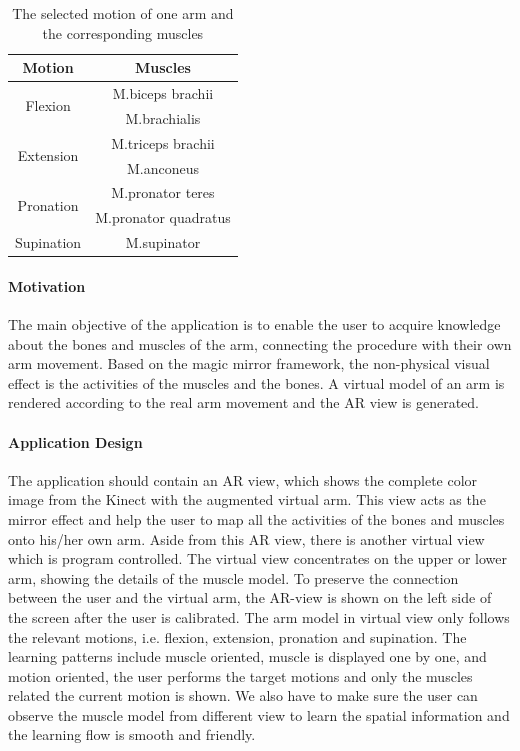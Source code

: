\begin{table}
	\caption[Muscles involved]{The selected motion of one arm and the corresponding muscles}
	\centering
	\label{tb:3-IMR:motionMuscles}
	\scriptsize
	\begin{center}
		\begin{tabular}{|c|c|}
			\hline
			Motion & Muscles \\
			\hline
			\multirow{2}{*}{Flexion} & M.biceps brachii \\
			& M.brachialis \\
			\hline
			\multirow{2}{*}{Extension} & M.triceps brachii \\
			& M.anconeus \\
			\hline
			\multirow{2}{*}{Pronation} & M.pronator teres \\
			& M.pronator quadratus \\
			\hline
			Supination &M.supinator \\
			\hline
		\end{tabular}
	\end{center}
\end{table}

\paragraph{Motivation}
The main objective of the application is to enable the user to acquire knowledge about the bones and muscles of the arm, connecting the procedure with their own arm movement. Based on the magic mirror framework, the non-physical visual effect is the activities of the muscles and the bones. A virtual model of an arm is rendered according to the real arm movement and the AR view is generated.

\paragraph{Application Design}
The application should contain an AR view, which shows the complete color image from the Kinect with the augmented virtual arm. This view acts as the mirror effect and help the user to map all the activities of the bones and muscles onto his/her own arm. Aside from this AR view, there is another virtual view which is program controlled. The virtual view concentrates on the upper or lower arm, showing the details of the muscle model. To preserve the connection between the user and the virtual arm, the AR-view is shown on the left side of the screen after the user is calibrated. The arm model in virtual view only follows the relevant motions, i.e. flexion, extension, pronation and supination. 
The learning patterns include muscle oriented, muscle is displayed one by one, and motion oriented, the user performs the target motions and only the muscles related the current motion is shown. 
We also have to make sure the user can observe the muscle model from different view to learn the spatial information and the learning flow is smooth and friendly. 

